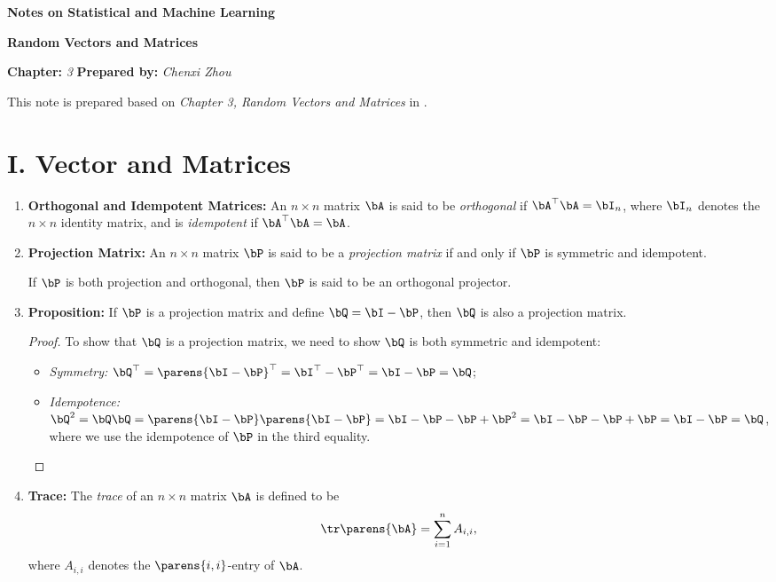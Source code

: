 \documentclass[12pt]{article}
\newcommand{\titlebox}[4]{
\begin{tcolorbox}[colback = blue!5!white!95, colframe = blue!70!black
]
  \noindent \textbf{ #1 } \hfill \textit{#2} 
  \begin{center}
  	 \LARGE{\textbf{#3}}
  \end{center}
\textbf{Chapter:} \textit{#4} \hfill \textbf{Prepared by:} \textit{Chenxi Zhou}
\end{tcolorbox}
}
\begin{document}
\titlebox{Notes on Statistical and Machine Learning}{}{Random Vectors and Matrices}{3}
\thispagestyle{plain}

\vspace{10pt}

This note is prepared based on \textit{Chapter 3, Random Vectors and Matrices} in \textcite{Izenman2009-jk}. 

\section*{I. Vector and Matrices} 

\begin{enumerate}[label=\textbf{\arabic*.}]
	
	\item \textbf{Orthogonal and Idempotent Matrices:} An $n \times n$ matrix $\bA$ is said to be \textit{orthogonal} if $\bA^\top \bA = \bI_n$, where $\bI_n$ denotes the $n \times n$ identity matrix, and is \textit{idempotent} if $\bA^\top \bA = \bA$. 
	
	\item \textbf{Projection Matrix:} An $n \times n$ matrix $\bP$ is said to be a \textit{projection matrix} if and only if $\bP$ is symmetric and idempotent. 
	
	If $\bP$ is both projection and orthogonal, then $\bP$ is said to be an orthogonal projector. 
	
	\item \textbf{Proposition:} If $\bP$ is a projection matrix and define $\bQ = \bI - \bP$, then $\bQ$ is also a projection matrix. 
	
	\begin{proof}
		To show that $\bQ$ is a projection matrix, we need to show $\bQ$ is both symmetric and idempotent: 
		\begin{itemize}
			\item \textit{Symmetry:} $\bQ^\top = \parens{\bI - \bP}^\top = \bI^\top - \bP^\top = \bI - \bP = \bQ$; 
			\item \textit{Idempotence:} $\bQ^2 = \bQ \bQ = \parens{\bI - \bP} \parens{\bI - \bP} = \bI - \bP - \bP + \bP^2 = \bI - \bP - \bP + \bP = \bI - \bP = \bQ$, where we use the idempotence of $\bP$ in the third equality. 
		\end{itemize}
	\end{proof} 
	
	\item \textbf{Trace:} The \textit{trace} of an $n \times n$ matrix $\bA$ is defined to be 
	\begin{align*}
		\tr \parens{\bA} = \sum_{i=1}^n A_{i,i}, 
	\end{align*}
	where $A_{i,i}$ denotes the $\parens{i, i}$-entry of $\bA$. 
	

\end{enumerate}
\end{document}
